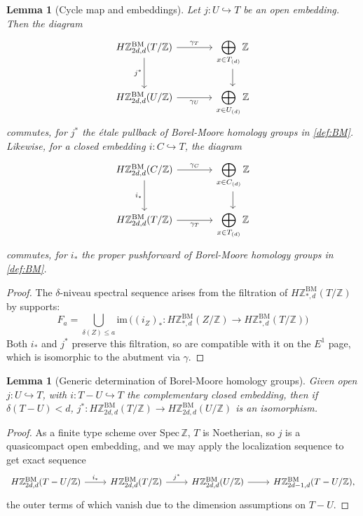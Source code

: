 \documentclass[11pt, twoside]{article}
\numberwithin{equation}{section}
\newtheorem{lemma}[equation]{Lemma}
\theoremstyle{definition}
\newcommand{\bb}[1]{\mathbb{#1}}
\newcommand{\im}{\mathrm{im} \,}
\newcommand{\spec}{\mathrm{Spec} \,}
\newcommand{\bm}{\mathrm{BM}}
\begin{document}
\begin{lemma}[Cycle map and embeddings]\label{lemm:cyc-emb}
Let \(j \colon U \hookrightarrow T\) be an open embedding. Then the diagram 
\[\begin{tikzcd} [column sep = large] H\bb{Z}_{2d, d}^\bm(T/\bb{Z}) \ar[d, "j^*", swap] \ar[r, "\gamma_T"] & \displaystyle \bigoplus_{x \in T_{(d)}} \bb{Z} \ar[d]\\
H\bb{Z}_{2d, d}^\bm(U/\bb{Z}) \ar[r, "\gamma_U", swap] & \displaystyle \bigoplus_{x \in U_{(d)}} \bb{Z} \end{tikzcd}\]
commutes, for \(j^*\) the étale pullback of Borel-Moore homology groups in \ref{def:BM}. Likewise, for a closed embedding \(i \colon C \hookrightarrow T\), the diagram 
\[\begin{tikzcd} [column sep = large] H\bb{Z}_{2d, d}^\bm(C/\bb{Z}) \ar[d, "i_*", swap] \ar[r, "\gamma_C"] & \displaystyle \bigoplus_{x \in C_{(d)}} \bb{Z} \ar[d]\\
H\bb{Z}_{2d, d}^\bm(T/\bb{Z}) \ar[r, "\gamma_T", swap] & \displaystyle \bigoplus_{x \in T_{(d)}} \bb{Z} \end{tikzcd}\]
commutes, for \(i_*\) the proper pushforward of Borel-Moore homology groups in \ref{def:BM}.
\end{lemma}

\begin{proof}
The \(\delta\)-niveau spectral sequence arises from the filtration of \(H\bb{Z}_{*, d}^\bm(T/\bb{Z})\) by supports: 
\[F_a  = \bigcup_{\delta(Z) \leq a} \im \! \Big ((i_Z)_* \colon H\bb{Z}_{*, d}^\bm(Z/\bb{Z}) \to H\bb{Z}_{*, d}^\bm(T/\bb{Z})\Big)\]
Both \(i_*\) and \(j^*\) preserve this filtration, so are compatible with it on the \(E^1\) page, which is isomorphic to the abutment via \(\gamma\).
\end{proof}

\begin{lemma}[Generic determination of Borel-Moore homology groups]\label{lemm:BM-excise}
Given open \(j \colon U \hookrightarrow T\), with \(i \colon T - U \hookrightarrow T\) the complementary closed embedding, then if \(\delta(T - U) < d\), \(j^* \colon H\bb{Z}_{2d, d}^\bm(T/\bb{Z}) \to H\bb{Z}_{2d, d}^\bm(U/\bb{Z})\) is an isomorphism.
\end{lemma}

\begin{proof}
As a finite type scheme over \(\spec \bb{Z}\), \(T\) is Noetherian, so \(j\) is a quasicompact open embedding, and we may apply the localization sequence to get exact sequence 
\[\begin{tikzcd} H\bb{Z}_{2d, d}^\bm(T - U/\bb{Z}) \ar[r, "i_*"] & H\bb{Z}_{2d, d}^\bm(T/\bb{Z}) \ar[r, "j^*"] & H\bb{Z}_{2d, d}^\bm(U/\bb{Z}) \ar[r] & H\bb{Z}_{2d - 1, d}^\bm(T - U/\bb{Z}), \end{tikzcd}\]
the outer terms of which vanish due to the dimension assumptions on \(T - U\).
\end{proof}
\end{document}
